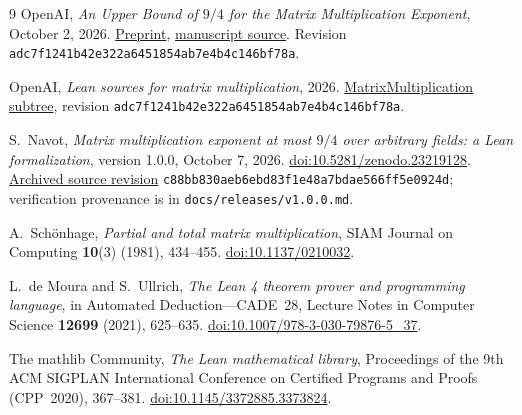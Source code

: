 \documentclass[11pt]{article}
\theoremstyle{remark}
\numberwithin{equation}{section}
\begin{document}
\begin{thebibliography}{9}
OpenAI, \emph{An Upper Bound of $9/4$ for the Matrix Multiplication
Exponent}, October 2, 2026.
\href{https://github.com/openai/math/blob/adc7f1241b42e322a6451854ab7e4b4c146bf78a/preprints/Matrix-Multiplication-Nine-Fourths-October-2-2026/paper.pdf}{Preprint},
\href{https://github.com/openai/math/blob/adc7f1241b42e322a6451854ab7e4b4c146bf78a/preprints/Matrix-Multiplication-Nine-Fourths-October-2-2026/build/paper.tex}{manuscript source}.
Revision \texttt{adc7f1241b42e322a6451854ab7e4b4c146bf78a}.

OpenAI, \emph{Lean sources for matrix multiplication}, 2026.
\href{https://github.com/openai/math/tree/adc7f1241b42e322a6451854ab7e4b4c146bf78a/lean/OAI/LinearAlgebra/MatrixMultiplication}{MatrixMultiplication subtree},
revision \texttt{adc7f1241b42e322a6451854ab7e4b4c146bf78a}.

S.~Navot, \emph{Matrix multiplication exponent at most $9/4$ over
arbitrary fields: a Lean formalization}, version 1.0.0, October 7, 2026.
\href{https://doi.org/10.5281/zenodo.23219128}{doi:10.5281/zenodo.23219128}.
\href{https://github.com/selanavot/matrix-multiplication-all-fields/tree/c88bb830aeb6ebd83f1e48a7bdae566ff5e0924d}{Archived source revision}
\texttt{c88bb830aeb6ebd83f1e48a7bdae566ff5e0924d};
verification provenance is in \texttt{docs/releases/v1.0.0.md}.

A.~Sch\"onhage, \emph{Partial and total matrix multiplication},
SIAM Journal on Computing \textbf{10}(3) (1981), 434--455.
\href{https://doi.org/10.1137/0210032}{doi:10.1137/0210032}.

L.~de Moura and S.~Ullrich, \emph{The Lean 4 theorem prover and
programming language}, in Automated Deduction---CADE~28,
Lecture Notes in Computer Science \textbf{12699} (2021), 625--635.
\href{https://doi.org/10.1007/978-3-030-79876-5_37}{doi:10.1007/978-3-030-79876-5\_37}.

The mathlib Community, \emph{The Lean mathematical library},
Proceedings of the 9th ACM SIGPLAN International Conference on
Certified Programs and Proofs (CPP~2020), 367--381.
\href{https://doi.org/10.1145/3372885.3373824}{doi:10.1145/3372885.3373824}.
\end{thebibliography}
\end{document}
